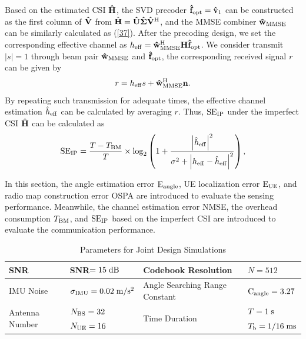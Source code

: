 \documentclass[journal,12pt,onecolumn,draftclsnofoot,]{IEEEtran}
\begin{document}
Based on the estimated CSI ${{\bf{\hat H}}}$, the SVD precoder ${{{{\bf{\hat f}}}_{{\rm{opt}}}}}={{{\bf{\hat v}}}_1}$ can be constructed as the first column of ${{\bf{\hat V}}}$ from $\hat {\bf{H}} = {\bf{\hat U\hat \Sigma }}{{{\bf{\hat V}}}^{\rm H}}$, and the MMSE combiner ${\bf{\hat w}}_{{\rm{MMSE}}}$ can be similarly calculated as (\ref{37}). 
After the precoding design, we set the corresponding effective channel as $h_{\rm eff}={\bf{\hat w}}_{{\rm{MMSE}}}^{\rm H} {\bf H} {\bf{\hat f}}_{\rm{opt}}$. We consider transmit $|{ s}|=1$ through beam pair ${\bf{\hat w}}_{{\rm{MMSE}}}$ and ${\bf{\hat f}}_{\rm{opt}}$, the corresponding received signal ${r}$ can be given by 
\begin{equation}
{r}=h_{\rm eff} s+{\bf{\hat w}}_{{\rm{MMSE}}}^{\rm H}{\bf n}.
\end{equation}
By repeating such transmission for adequate times, the effective channel estimation ${\hat h}_{\rm eff}$ can be calculated by averaging ${r}$.
Thus, ${\rm{S}}{{\rm{E}}_{{\rm{IP}}}}$ under the imperfect CSI $\hat {\bf{H}}$ can be calculated as
\begin{equation}
\label{40}
\begin{aligned}
{\rm{S}}{{\rm{E}}_{{\rm{IP}}}} = \frac{{{{T}} - {{{T}}_{{\rm{BM}}}}}}{{{T}}}\times{\log _2}\left( {{{1}} + \frac{\left|{\hat h}_{\rm eff}\right|^2 }{{{\rm{\sigma }}^2}+\left|{h}_{\rm eff}- {\hat h}_{\rm eff}\right|^2} }\right),
\end{aligned}
\end{equation}

In this section, the angle estimation error ${{\rm{E}}_{{\rm{angle}}}}$, UE localization error ${{\rm{E}}_{{\rm{UE}}}}$, and radio map construction error OSPA are introduced to evaluate the sensing performance. 
Meanwhile, the channel estimation error NMSE, the overhead consumption ${{{T}}_{{\rm{BM}}}}$, and ${\rm{S}}{{\rm{E}}_{{\rm{IP}}}}$ based on the imperfect CSI are introduced to evaluate the communication performance.
\begin{table}[]
\caption{\color{black}Parameters for Joint Design Simulations}\vspace{-8mm}
\label{table2}
\center
\begin{tabular}{|l|l|l|l|}
\hline
SNR & SNR\;$=15\;{\rm {dB}}$ & Codebook Resolution & $N=512$ \\ \hline
IMU Noise & $\sigma _{{\rm{IMU}}}=0.02\;{\rm m/s^2}$ & Angle Searching Range Constant & ${{\rm C}_{\rm angle}}=3.27$ \\ \hline
\multirow{2}{*}{Antenna Number} & ${N_{{\rm{BS}}}} = 32$ & \multirow{2}{*}{Time Duration} & ${{T}} = 1\;{{\rm s}}$ \\ \cline{2-2} \cline{4-4} 
& ${N_{{\rm{UE}}}} = 16$ & & ${{{T}}_{\rm{b}}} = {1}/{{16}}\;{\rm{ms}}$ \\ \hline
\end{tabular}
\vspace{-10mm}
\end{table}
\end{document}
